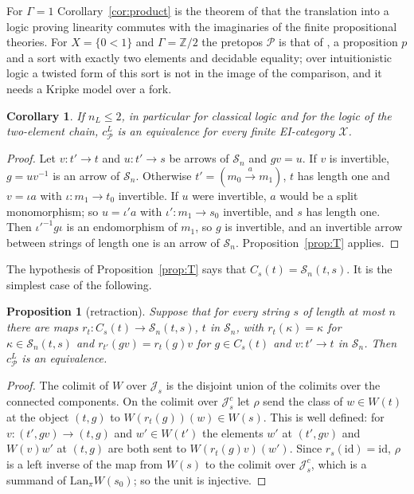 \documentclass[11pt]{amsart}
\newtheorem{cor}[thm]{Corollary}
\newtheorem{prop}[thm]{Proposition}
\theoremstyle{definition}
\newcommand{\cX}{\mathcal X}
\newcommand{\cP}{\mathcal P}
\newcommand{\cS}{\mathcal S}
\newcommand{\cJ}{\mathcal J}
\newcommand{\id}{\mathrm{id}}
\begin{document}
For $\Gamma=1$ Corollary~\ref{cor:product} is the theorem of \cite{Interm} that the translation
into a logic proving linearity commutes with the imaginaries of the
finite propositional theories. For $X=\{0<1\}$ and $\Gamma=\mathbb Z/2$
the pretopos $\cP$ is that of \cite[Ex.~7.16]{Heyting}, a proposition
$p$ and a sort with exactly two elements and decidable equality; over
intuitionistic logic a twisted form of this sort is not in the image
of the comparison, and it needs a Kripke model over a fork.

\begin{cor}\label{cor:two}
If $n_L\le2$, in particular for classical logic and for the logic of
the two-element chain, $c^L_\cP$ is an equivalence for every finite
EI-category $\cX$.
\end{cor}
\begin{proof}
Let $v\colon t'\to t$ and $u\colon t'\to s$ be arrows of $\cS_n$ and
$gv=u$. If $v$ is invertible, $g=uv^{-1}$ is an arrow of $\cS_n$.
Otherwise $t'=(m_0\xrightarrow{a}m_1)$, $t$ has length one and
$v=\iota a$ with $\iota\colon m_1\to t_0$ invertible. If $u$ were
invertible, $a$ would be a split monomorphism; so $u=\iota'a$ with
$\iota'\colon m_1\to s_0$ invertible, and $s$ has length one. Then
$\iota'^{-1}g\iota$ is an endomorphism of $m_1$, so $g$ is invertible,
and an invertible arrow between strings of length one is an arrow of
$\cS_n$. Proposition~\ref{prop:T} applies.
\end{proof}

The hypothesis of Proposition~\ref{prop:T} says that $C_s(t)=\cS_n(t,
s)$. It is the simplest case of the following.

\begin{prop}[retraction]\label{prop:retract}
Suppose that for every string $s$ of length at most $n$ there are maps
$r_t\colon C_s(t)\to\cS_n(t,s)$, $t$ in $\cS_n$, with $r_t(\kappa)=
\kappa$ for $\kappa\in\cS_n(t,s)$ and $r_{t'}(gv)=r_t(g)v$ for $g\in
C_s(t)$ and $v\colon t'\to t$ in $\cS_n$. Then $c^L_\cP$ is an
equivalence.
\end{prop}
\begin{proof}
The colimit of $W$ over $\cJ_s$ is the disjoint union of the colimits
over the connected components. On the colimit over $\cJ^c_s$ let
$\rho$ send the class of $w\in W(t)$ at the object $(t,g)$ to
$W(r_t(g))(w)\in W(s)$. This is well defined: for $v\colon(t',gv)\to
(t,g)$ and $w'\in W(t')$ the elements $w'$ at $(t',gv)$ and $W(v)w'$
at $(t,g)$ are both sent to $W(r_t(g)v)(w')$. Since $r_s(\id)=\id$,
$\rho$ is a left inverse of the map from $W(s)$ to the colimit over
$\cJ^c_s$, which is a summand of $\mathrm{Lan}_\pi W(s_0)$; so the unit
is injective.
\end{proof}
\end{document}
